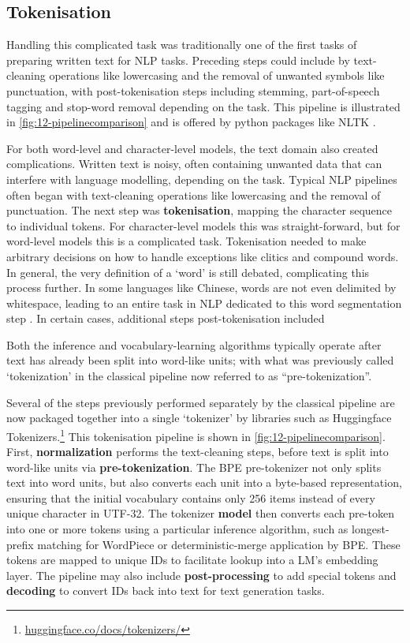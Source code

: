\subsection{Tokenisation}\label{12-tokenisation}

Handling this complicated task was traditionally one of the first tasks of preparing written text for NLP tasks. Preceding steps could include by text-cleaning operations like lowercasing and the removal of unwanted symbols like punctuation, with post-tokenisation steps including stemming, part-of-speech tagging and stop-word removal depending on the task. This pipeline is illustrated in \cref{fig:12-pipelinecomparison} and is offered by python packages like NLTK \addcites.

For both word-level and character-level \ngram models, the text domain also created complications. Written text is noisy, often containing unwanted data that can interfere with language modelling, depending on the task. Typical NLP pipelines often began with text-cleaning operations like lowercasing and the removal of punctuation. The next step was \textbf{tokenisation}, mapping the character sequence to individual tokens. For character-level models this was straight-forward, but for word-level models this is a complicated task. Tokenisation needed to make arbitrary decisions on how to handle exceptions like clitics and compound words. In general, the very definition of a `word' is still debated, complicating this process further. In some languages like Chinese, words are not even delimited by whitespace, leading to an entire task in NLP dedicated to this word segmentation step \addcites. In certain cases, additional steps post-tokenisation included 

Both the inference and vocabulary-learning algorithms typically operate after text has already been split into word-like units; with what was previously called `tokenization' in the classical pipeline now referred to as ``pre-tokenization''. 

Several of the steps previously performed separately by the classical pipeline are now packaged together into a single `tokenizer' by libraries such as Huggingface Tokenizers.\footnote{\href{https://huggingface.co/docs/tokenizers/index}{huggingface.co/docs/tokenizers/}} This tokenisation pipeline is shown in \cref{fig:12-pipelinecomparison}. First, \textbf{normalization} performs the text-cleaning steps, before text is split into word-like units via \textbf{pre-tokenization}. The BPE pre-tokenizer not only splits text into word units, but also converts each unit into a byte-based representation, ensuring that the initial vocabulary contains only 256 items instead of every unique character in UTF-32. The tokenizer \textbf{model} then converts each pre-token into one or more tokens using a particular inference algorithm, such as longest-prefix matching for WordPiece or deterministic-merge application by BPE. These tokens are mapped to unique IDs to facilitate lookup into a LM's embedding layer. The pipeline may also include \textbf{post-processing} to add special tokens and \textbf{decoding} to convert IDs back into text for text generation tasks. 

